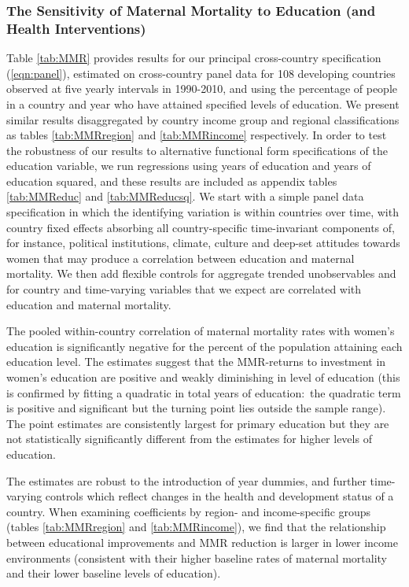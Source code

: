 \documentclass{article}[12pt,subeqn]
\begin{document}
\begin{spacing}{1.4}
\subsubsection{The Sensitivity of Maternal Mortality to Education (and Health Interventions)}
Table \ref{tab:MMR} provides results for our principal cross-country specification (\ref{eqn:panel}), estimated 
on cross-country panel data for 108 developing countries observed at five yearly intervals in 1990-2010, and 
using the percentage of people in a country and year who have attained specified levels of education. We present 
similar results disaggregated by country income group and regional classifications as tables \ref{tab:MMRregion} 
and \ref{tab:MMRincome} respectively. In order to test the robustness of our results to alternative functional 
form specifications of the education variable, we run regressions using years of education and years of education 
squared, and these results are included as appendix tables \ref{tab:MMReduc} and \ref{tab:MMReducsq}. We start 
with a simple panel data specification in which the identifying variation is within countries over time, with 
country fixed effects absorbing all country-specific time-invariant components of, for instance, political 
institutions, climate, culture and deep-set attitudes towards women that may produce a correlation between education 
and maternal mortality. We then add flexible controls for aggregate trended unobservables and for country and 
time-varying variables that we expect are correlated with education and maternal mortality.

The pooled within-country correlation of maternal mortality rates with women's education is significantly
negative for the percent of the population attaining each education level. The estimates suggest that the
MMR-returns to investment in women’s education are positive and weakly diminishing in level of education
(this is confirmed by fitting a quadratic in total years of education:\ the quadratic term is positive and
significant but the turning point lies outside the sample range). The point estimates are consistently largest
for primary education but they are not statistically significantly different from the estimates for higher levels
of education.

The estimates are robust to the introduction of year dummies, and further time-varying controls which
reflect changes in the health and development status of a country. When examining coefficients by region-
and income-specific groups (tables \ref{tab:MMRregion} and \ref{tab:MMRincome}), we find that the relationship 
between educational improvements and MMR reduction is larger in lower income environments (consistent with 
their higher baseline rates of maternal mortality and their lower baseline levels of education).


\end{spacing}
\end{document}
